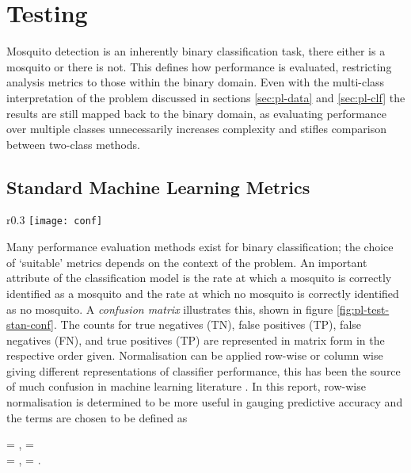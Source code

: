 \section{Testing}
\label{sec:pl-test}
    Mosquito detection is an inherently binary classification task, there either is a mosquito or there is not. This defines how performance is evaluated, restricting analysis metrics to those within the binary domain. Even with the multi-class interpretation of the problem discussed in sections \ref{sec:pl-data} and \ref{sec:pl-clf} the results are still mapped back to the binary domain, as evaluating performance over multiple classes unnecessarily increases complexity and stifles comparison between two-class methods.
    \subsection{Standard Machine Learning Metrics}
    \label{subsec:pl-test-stan}
         \begin{wrapfigure}{r}{0.3\textwidth}
            \centering
            \texttt{[image: conf]}
            \caption{An example confusion matrix of an SVM output.}
            \label{fig:pl-test-stan-conf}
        \end{wrapfigure}
        Many performance evaluation methods exist for binary classification; the choice of `suitable' metrics depends on the context of the problem. An important attribute of the classification model is the rate at which a mosquito is correctly identified as a mosquito and the rate at which no mosquito is correctly identified as no mosquito. A \textit{confusion matrix} illustrates this, shown in figure \ref{fig:pl-test-stan-conf}. The counts for true negatives (TN), false positives (TP), false negatives (FN), and true positives (TP) are represented in matrix form in the respective order given. Normalisation can be applied row-wise or column wise giving different representations of classifier performance, this has been the source of much confusion in machine learning literature \cite{Gambino2006}. In this report, row-wise normalisation is determined to be more useful in gauging predictive accuracy and the terms are chosen to be defined as
        \begin{tgather}
            \footnotesize{} = ,  = \\
            \footnotesize{} = ,  = .
        \end{tgather}
        
